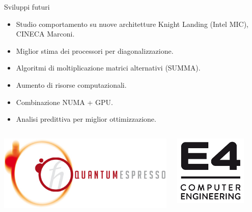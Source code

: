 \documentclass[8pt]{beamer}
\begin{document}
\begin{frame}{Sviluppi futuri}
	\begin{itemize}
		\item Studio comportamento su nuove architetture Knight Landing (Intel MIC), CINECA Marconi.
		\item Miglior stima dei processori per diagonalizzazione.
		\item Algoritmi di moltiplicazione matrici alternativi (SUMMA).
		\item Aumento di risorse computazionali.
		\item Combinazione NUMA + GPU.
		\item Analisi predittiva per miglior ottimizzazione.
	\end{itemize}
	\vspace{1cm}
	\begin{columns}
		\begin{center}
			\includegraphics[width=1.2\textwidth]{beam_qe_logo.jpg}
		\end{center}
		\begin{center}
			\includegraphics[width=0.8\textwidth]{beam_e4_logo.png}

\end{center}
\end{columns}
\end{frame}
\end{document}
